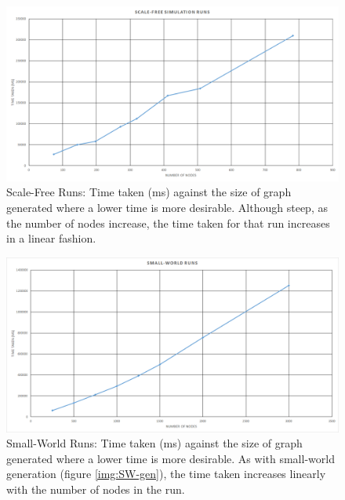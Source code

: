 \documentclass[]{report}
\begin{document}
\begin{figure}
\label{img:SF-run}
\begin{center}
\includegraphics[width=\textwidth]{scale-free-runs.png}
\end{center}
\caption{Scale-Free Runs: Time taken (ms) against the size of graph generated where a lower time is more desirable. Although steep, as the number of nodes increase, the time taken for that run increases in a linear fashion.}
\end{figure}
\begin{figure}
\label{img:SW-run}
\begin{center}
\includegraphics[width=\textwidth]{small-world-runs.png}
\end{center}
\caption{Small-World Runs: Time taken (ms) against the size of graph generated where a lower time is more desirable. As with small-world generation (figure \ref{img:SW-gen}), the time taken increases linearly with the number of nodes in the run.}
\end{figure}
\end{document}
